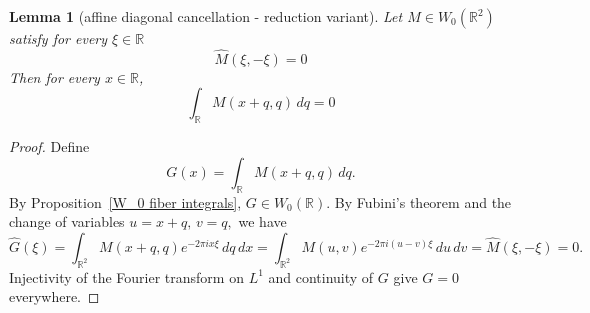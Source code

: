\documentclass[12pt,reqno]{amsart}
\theoremstyle{plain}
\newtheorem{lemma}[theorem]{Lemma}
\numberwithin{equation}{section}
\theoremstyle{remark}
\newcommand{\uses}[1]{}
\newcommand{\usesdefs}[1]{}
\begin{document}
\begin{lemma}[affine diagonal cancellation - reduction variant]
\label{lem:affine-diagonal-cancellation-reduction}\uses{W_0 fiber integrals}\usesdefs{auto:Wiener-space-definition}
Let \(M\in W_0(\mathbb R^2)\) satisfy for every \(\xi\in\mathbb R\)
\begin{equation}\label{auto:affine-diagonal-cancellation-assumption}
\widehat M(\xi,-\xi)=0
\end{equation}
 Then for every \(x\in\mathbb R\),
\begin{equation}
    \label{E:affine-diagonal-cancellation}
    \int_{\mathbb R}M(x+q,q)\,dq=0
\end{equation}
\end{lemma}

\begin{proof}
    Define
\[
G(x)=\int_{\mathbb R}M(x+q,q)\,dq.
\]
By Proposition~\ref{W_0 fiber integrals}, \(G\in W_0(\mathbb R)\).
By Fubini's theorem and the change of variables
$ u=x+q, \, v=q, $
we have
\[
\widehat G(\xi)
=
\int_{\mathbb R^2}
M(x+q,q)e^{-2\pi ix\xi}\,dq\,dx
=
\int_{\mathbb R^2}
M(u,v)e^{-2\pi i(u-v)\xi}\,du\,dv=
\widehat M(\xi,-\xi)
=
0.
\]
Injectivity of the Fourier transform on \(L^1\) and continuity of $G$ give
\(G=0\) everywhere.
\end{proof}
\end{document}
